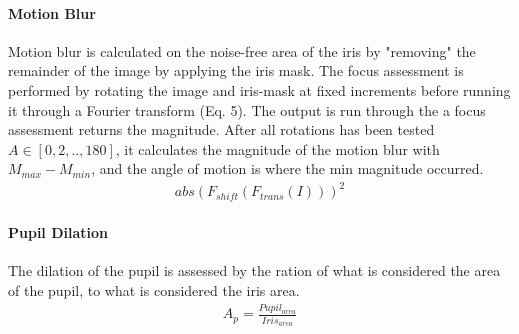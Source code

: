 \paragraph{Motion Blur}
Motion blur is calculated on the noise-free area of the iris by "removing" the 
remainder of the image by applying the iris mask.  The focus assessment is
performed by rotating the image and iris-mask at fixed increments before running
it through a Fourier transform (Eq. 5). The output is run through the a focus
assessment returns the magnitude. After all rotations has been tested $A\in
[0,2,..,180]$, it calculates the magnitude of the motion blur with
$M_{max}-M_{min}$, and the angle of motion is where the min magnitude occurred.
\begin{align}
abs( F_{shift}( F_{trans}( I ) ) )^2 
\end{align}



\paragraph{Pupil Dilation}
The dilation of the pupil is assessed by the ration of what is considered the
area of the pupil, to what is considered the iris area.
\begin{align}
A_p = \frac{Pupil_{area}}{Iris_{area}} 
\end{align}


